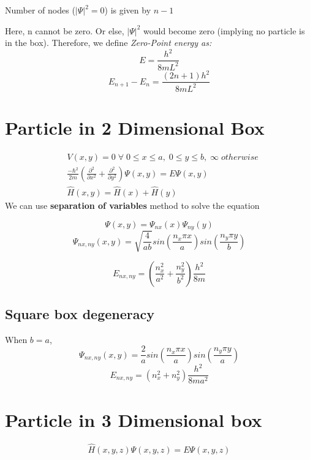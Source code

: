 \documentclass[12pt]{extarticle}
\begin{document}
Number of nodes ($ \left| \Psi \right|^2 = 0$) is given by $n - 1$

Here, n cannot be zero. Or else, $ \left| \Psi \right|^2 $ would become zero (implying no particle is in the box). Therefore, we define \textit{Zero-Point energy as:} 
\[
	E = \frac{h^2}{8mL^2} 
\]
\begin{equation}
	E_{n + 1} - E_n = \frac{(2n + 1) h^2}{8mL^2} 
\end{equation}

\section{Particle in 2 Dimensional Box}
\begin{align}
	&V(x, y) = 0 \;\forall\; 0 \leq x \leq a, \; 0 \leq y \leq b, \; \infty\;otherwise\\
	&\frac{-\hbar^2}{2m} \left( \frac{\partial^2}{\partial x^2} + \frac{\partial^2}{\partial y^2}  \right) \Psi(x, y) = E\Psi(x, y) \\
	&\hat{H}(x, y) = \hat{H}(x) + \hat{H}(y)
\end{align}
We can use \textbf{separation of variables} method to solve the equation

\begin{equation}
	\Psi(x, y) = \Psi_{nx} (x) \Psi_{ny}(y)
\end{equation}
\begin{equation}
	\Psi_{nx, ny}(x, y) = \sqrt{\frac{4}{ab}} sin \left( \frac{n_x \pi x}{a}  \right) sin \left( \frac{n_y \pi y}{b}  \right)
\end{equation}

\begin{equation}
	E_{nx, ny} = \left( \frac{n_x^2}{a^2} + \frac{n_y^2}{b^2}  \right) \frac{h^2}{8m} 
\end{equation}

\subsection{Square box degeneracy}
When $b = a$, 
\[
	\Psi_{nx, ny} (x, y) = \frac{2}{a} sin \left( \frac{n_x \pi x}{a} \right) sin \left( \frac{n_y \pi y}{a}  \right)
\]
\begin{equation}
	E_{nx, ny} = (n_x^2 + n_y^2) \frac{h^2}{8ma^2} 
\end{equation}

\section{Particle in 3 Dimensional box}
\begin{equation}
	\hat{H}(x, y, z) \Psi(x, y, z) = E \Psi(x, y, z)
\end{equation}
\end{document}
